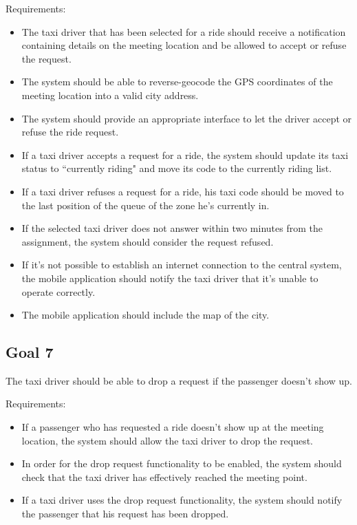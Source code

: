 Requirements:
\begin{itemize}
\item The taxi driver that has been selected for a ride should receive a notification containing details on the meeting location and be allowed to accept or refuse the request.
\item The system should be able to reverse-geocode the GPS coordinates of the meeting location into a valid city address.
\item The system should provide an appropriate interface to let the driver accept or refuse the ride request.
\item If a taxi driver accepts a request for a ride, the system should update its taxi status to ``currently riding" and move its code to the currently riding list.
\item If a taxi driver refuses a request for a ride, his taxi code should be moved to the last position of the queue of the zone he's currently in.
\item If the selected taxi driver does not answer within two minutes from the assignment, the system should consider the request refused. 
\item If it's not possible to establish an internet connection to the central system, the mobile application should notify the taxi driver that it's unable to operate correctly.
\item The mobile application should include the map of the city.
\end{itemize}


\subsection{Goal 7}
The taxi driver should be able to drop a request if the passenger doesn't show up.

Requirements:
\begin{itemize}
\item If a passenger who has requested a ride doesn't show up at the meeting location, the system should allow the taxi driver to drop the request. 
\item In order for the drop request functionality to be enabled, the system should check that the taxi driver has effectively reached the meeting point.
\item If a taxi driver uses the drop request functionality, the system should notify the passenger that his request has been dropped.
\end{itemize}


